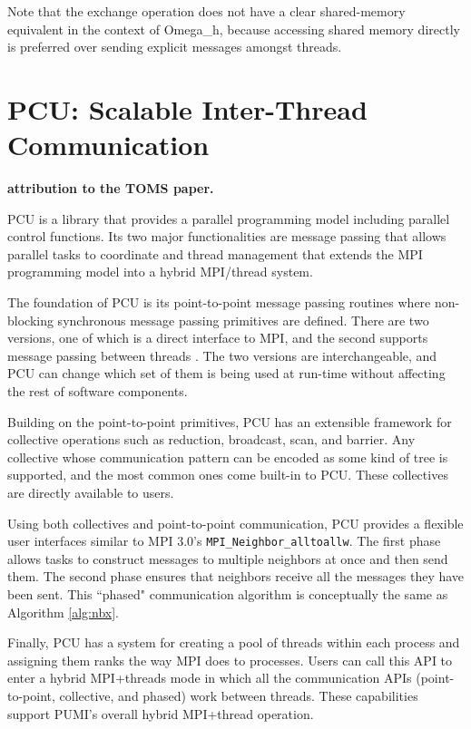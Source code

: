 Note that the exchange operation does not have a clear shared-memory equivalent
in the context of Omega\_h,
because accessing shared memory directly is preferred over sending
explicit messages amongst threads.

\section{PCU: Scalable Inter-Thread Communication}
\label{sec:pcu}

{\bf attribution to the TOMS paper.}

PCU is a library that provides a parallel programming model including
parallel control functions.
Its two major functionalities are message passing that allows parallel tasks to
coordinate and thread management that extends the MPI programming model
into a hybrid MPI/thread system.

The foundation of PCU is its point-to-point message passing routines where
non-blocking synchronous message passing primitives are defined. There are
two versions, one of which is a direct interface to MPI, and the second supports
message passing between threads \cite{ibanez2014hybrid}. The two versions
are interchangeable, and PCU can change which set of them is being used at
run-time without affecting the rest of software components.

Building on the point-to-point primitives, PCU has an extensible framework for
collective operations such as reduction, broadcast, scan, and barrier.
Any collective whose communication pattern can be encoded as some kind of tree
is supported, and the most common ones come built-in to PCU.
These collectives are directly available to users.

Using both collectives and point-to-point communication, PCU provides a flexible
user interfaces similar to MPI 3.0's \texttt{MPI\_Neighbor\_alltoallw}.
The first phase
allows tasks to construct messages to multiple neighbors
at once and then send them.
The second phase ensures that neighbors
receive all the messages they have been sent.
This ``phased" communication algorithm is
conceptually the same as Algorithm \ref{alg:nbx}.

Finally, PCU has a system for creating a pool of threads within each process and
assigning them ranks the way MPI does to processes.
Users can call this API to enter a hybrid MPI+threads mode in which all the
communication APIs (point-to-point, collective, and phased) work between
threads.
These capabilities support PUMI's overall hybrid MPI+thread operation.

